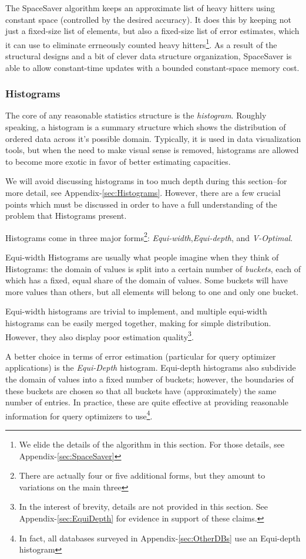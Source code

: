 The SpaceSaver algorithm keeps an approximate list of heavy hitters using constant space (controlled by the desired accuracy). It does this by keeping not just a fixed-size list of elements, but also a fixed-size list of error estimates, which it can use to eliminate errneously counted heavy hitters\footnote{We elide the details of the algorithm in this section. For those details, see Appendix-\ref{sec:SpaceSaver}}. As a result of the structural designs and a bit of clever data structure organization, SpaceSaver is able to allow constant-time updates with a bounded constant-space memory cost.

\subsubsection{Histograms}
The core of any reasonable statistics structure is the \emph{histogram}. Roughly speaking, a histogram is a summary structure which shows the distribution of ordered data across it's possible domain. Typically, it is used in data visualization tools, but when the need to make visual sense is removed, histograms are allowed to become more exotic in favor of better estimating capacities.

We will avoid discussing histograms in too much depth during this section--for more detail, see Appendix-\ref{sec:Histograms}. However, there are a few crucial points which must be discussed in order to have a full understanding of the problem that Histograms present.

Histograms come in three major forms\footnote{There are actually four or five additional forms, but they amount to variations on the main three}: \emph{Equi-width},\emph{Equi-depth}, and \emph{V-Optimal}.

Equi-width Histograms are usually what people imagine when they think of Histograms: the domain of values is split into a certain number of \emph{buckets}, each of which has a fixed, equal share of the domain of values. Some buckets will have more values than others, but all elements will belong to one and only one bucket. 

Equi-width histograms are trivial to implement, and multiple equi-width histograms can be easily merged together, making for simple distribution. However, they also display poor estimation quality\footnote{In the interest of brevity, details are not provided in this section. See Appendix-\ref{sec:EquiDepth} for evidence in support of these claims.}.

A better choice in terms of error estimation (particular for query optimizer applications) is the \emph{Equi-Depth} histogram. Equi-depth histograms also subdivide the domain of values into a fixed number of buckets; however, the boundaries of these buckets are chosen so that all buckets have (approximately) the same number of entries. In practice, these are quite effective at providing reasonable information for query optimizers to use\footnote{In fact, all databases surveyed in Appendix-\ref{sec:OtherDBs} use an Equi-depth histogram}. 

